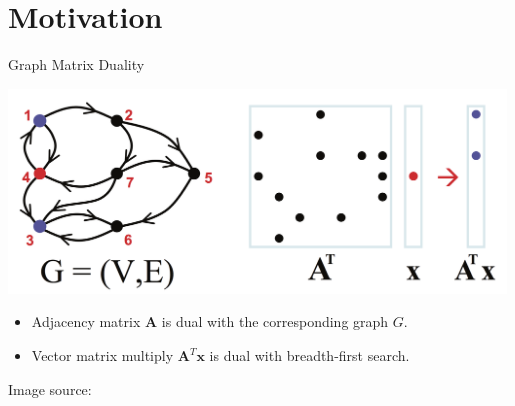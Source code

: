 
\section{Motivation}

\begin{frame}{Graph Matrix Duality}
	\vspace{-25pt}
	
  \begin{center}
  	\includegraphics[width=0.99\textwidth]{figures/graph2matrix}
  \end{center}
  
  \pause 
  
  
  \begin{itemize}
  	\item   Adjacency matrix $\mathbf{A}$ is dual with the corresponding graph $G$.
  	\pause 
  	\item Vector matrix multiply $\mathbf{A}^T\mathbf{x}$ is dual with breadth-first search.
  \end{itemize}
 
{  \footnotesize
  Image source: \cite{kepner2011graph}
 } 

\end{frame}
